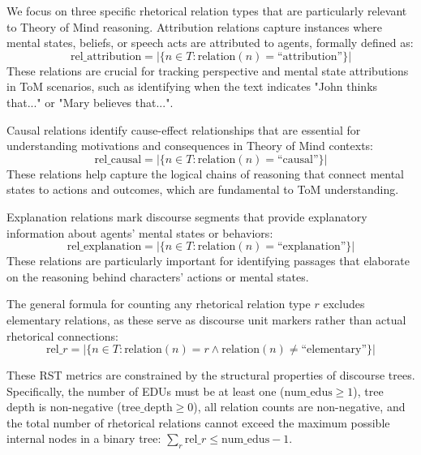 \documentclass[12pt]{article}
\begin{document}
We focus on three specific rhetorical relation types that are particularly relevant to Theory of Mind reasoning. Attribution relations capture instances where mental states, beliefs, or speech acts are attributed to agents, formally defined as:
\begin{equation}
\text{rel\_attribution} = |\{n \in T : \text{relation}(n) = \text{``attribution''}\}|
\end{equation}
These relations are crucial for tracking perspective and mental state attributions in ToM scenarios, such as identifying when the text indicates "John thinks that..." or "Mary believes that...".

Causal relations identify cause-effect relationships that are essential for understanding motivations and consequences in Theory of Mind contexts:
\begin{equation}
\text{rel\_causal} = |\{n \in T : \text{relation}(n) = \text{``causal''}\}|
\end{equation}
These relations help capture the logical chains of reasoning that connect mental states to actions and outcomes, which are fundamental to ToM understanding.

Explanation relations mark discourse segments that provide explanatory information about agents' mental states or behaviors:
\begin{equation}
\text{rel\_explanation} = |\{n \in T : \text{relation}(n) = \text{``explanation''}\}|
\end{equation}
These relations are particularly important for identifying passages that elaborate on the reasoning behind characters' actions or mental states.

The general formula for counting any rhetorical relation type $r$ excludes elementary relations, as these serve as discourse unit markers rather than actual rhetorical connections:
\begin{equation}
\text{rel\_}r = |\{n \in T : \text{relation}(n) = r \land \text{relation}(n) \neq \text{``elementary''}\}|
\end{equation}

These RST metrics are constrained by the structural properties of discourse trees. Specifically, the number of EDUs must be at least one ($\text{num\_edus} \geq 1$), tree depth is non-negative ($\text{tree\_depth} \geq 0$), all relation counts are non-negative, and the total number of rhetorical relations cannot exceed the maximum possible internal nodes in a binary tree: $\sum_{r} \text{rel\_}r \leq \text{num\_edus} - 1$.
\end{document}
